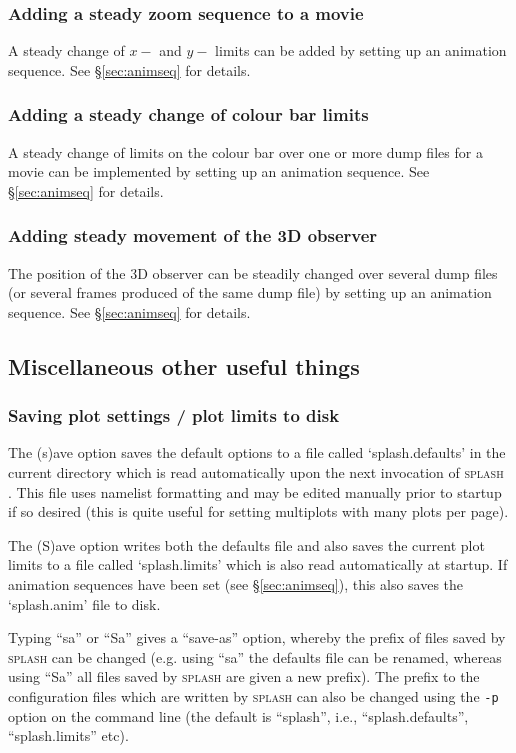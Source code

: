 \documentclass[a4paper,10pt]{article}
\newcommand{\splash}{\textsc{splash }}
\begin{document}
\subsubsection{ Adding a steady zoom sequence to a movie}
 A steady change of $x-$ and $y-$ limits can be added by setting up an animation sequence. See \S\ref{sec:animseq} for details.

\subsubsection{ Adding a steady change of colour bar limits}
 A steady change of limits on the colour bar over one or more dump files for a movie can be implemented by setting up an animation sequence. See \S\ref{sec:animseq} for details.

\subsubsection{ Adding steady movement of the 3D observer}
\label{sec:move3Dobserver}
 The position of the 3D observer can be steadily changed over several dump files (or several frames produced of the same dump file) by setting up an animation sequence.  See \S\ref{sec:animseq} for details.

\subsection{Miscellaneous other useful things}

\subsubsection{ Saving plot settings / plot limits to disk}
 The (s)ave option saves the default options to a file called `splash.defaults' in the
current directory which is read automatically upon the next invocation of
\splash. This file uses namelist formatting and may be edited manually prior to  
startup if so desired (this is quite useful for setting multiplots with many plots per
 page).
 
  The (S)ave option writes both the defaults file and also saves the current plot
limits to a file called `splash.limits' which is also read automatically
at startup. If animation sequences have been set (see \S\ref{sec:animseq}), this also saves the `splash.anim' file to disk.

 Typing ``sa'' or ``Sa'' gives a ``save-as'' option, whereby the prefix of files saved by \splash can be changed (e.g. using ``sa'' the defaults file can be renamed, whereas using ``Sa'' all files saved by \splash are given a new prefix). The prefix to the configuration files which are written by \splash can also be changed using the \verb+-p+ option on the command line (the default is ``splash'', i.e., ``splash.defaults'', ``splash.limits'' etc).
\end{document}
